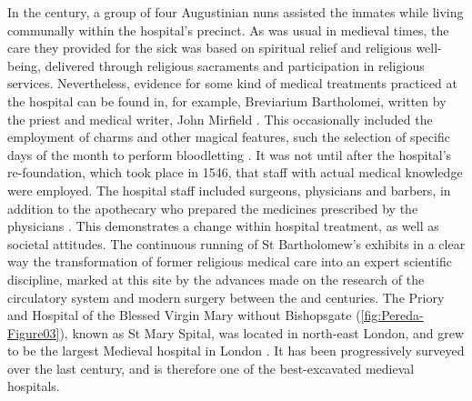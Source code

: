 \documentclass[%
	]{ijsra}
\renewcommand\AD{\xspace}
\begin{document}
In the  century\AD, a group of four Augustinian nuns assisted the inmates while living communally within the hospital’s precinct. As was usual in medieval times, the care they provided for the sick was based on spiritual relief and religious well-being, delivered through religious sacraments and participation in religious services. 
Nevertheless, evidence for some kind of medical treatments practiced at the hospital can be found in, for example, Breviarium Bartholomei, written by the priest and medical writer, John Mirfield \parencite[36-37]{Dainton_1961}. 
This occasionally included the employment of charms and other magical features, such the selection of specific days of the month to perform bloodletting \parencite[35-36]{Rider_2012}. 
It was not until after the hospital’s re-foundation, which took place in 1546, that staff with actual medical knowledge were employed. The hospital staff included surgeons, physicians and barbers, in addition to the apothecary who prepared the medicines prescribed by the physicians \parencite[38-39]{Dainton_1961}. This demonstrates a change within hospital treatment, as well as societal attitudes.  
The continuous running of St Bartholomew’s exhibits in a clear way the transformation of former religious medical care into an expert scientific discipline, marked at this site by the advances made on the research of the circulatory system and modern surgery between the  and  centuries.
\IJSRAseparator
{}
The Priory and Hospital of the Blessed Virgin Mary without Bishopsgate (\cref{fig:Pereda-Figure03}), %
known as St Mary Spital, was located in north-east London, and grew to be the largest Medieval hospital in London \parencite[60]{Bowers_2007}. It has been progressively surveyed over the last century, and is therefore one of the best-excavated medieval hospitals. 
\end{document}
